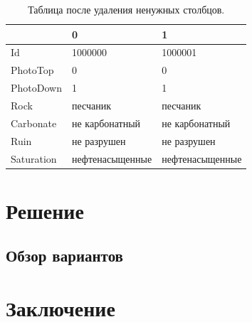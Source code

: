 \documentclass[14pt]{matmex-diploma}
\begin{document}
    
    \begin{table}[b]
        \centering
        \begin{tabular}{|l|l|l|}
            \hline
            {} &                0 &                1 \\
            \hline
            Id             &          1000000 &          1000001 \\
            PhotoTop       &                0 &                0 \\
            PhotoDown      &                1 &                1 \\
            Rock           &         песчаник &         песчаник \\
            Carbonate      &   не карбонатный &   не карбонатный \\
            Ruin           &      не разрушен &      не разрушен \\
            Saturation     &  нефтенасыщенные &  нефтенасыщенные \\
            \hline
        \end{tabular}
        \caption{Таблица после удаления ненужных столбцов.}
        \label{sample_table_cleaned}  
    \end{table}    


\section{Решение}

    \subsection{Обзор вариантов}
    



\section*{Заключение}


\setmonofont[Mapping=tex-text]{CMU Typewriter Text}


\end{document}
